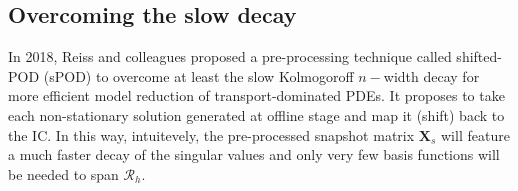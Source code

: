 \documentclass[../main.tex]{subfiles}
\begin{document}
\subsection{Overcoming the slow decay}\label{subsec:overcoming_slow_decay}

In 2018, Reiss and colleagues \cite{Reiss18} proposed a pre-processing technique called shifted-POD (sPOD) to overcome at least the slow Kolmogoroff $n-$width decay for more efficient model reduction of transport-dominated PDEs.
It proposes to take each non-stationary solution generated at offline stage and map it (shift) back to the IC.
In this way, intuitevely, the pre-processed snapshot matrix $\boldsymbol{X}_{s}$ will feature a much faster decay of the singular values and only very few basis functions will be needed to span $\mathcal{R}_{h}$. 


\end{document}
